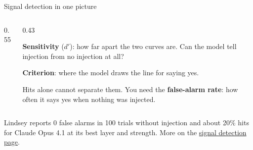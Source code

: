 \documentclass[aspectratio=169,11pt]{beamer}
\begin{document}
\begin{frame}[label=sdt]{Signal detection in one picture}
\begin{columns}[T]
\begin{column}{0.55\textwidth}
\end{column}
\begin{column}{0.43\textwidth}
{\small
\textbf{\textcolor{report}{Sensitivity}} ($d'$): how far apart the two curves are. Can the model tell injection from no injection at all?

\vspace{0.5em}
\textbf{\textcolor{bias}{Criterion}}: where the model draws the line for saying yes.

\vspace{0.5em}
Hits alone cannot separate them. You need the \textbf{false-alarm rate}: how often it says yes when nothing was injected.
}
\end{column}
\end{columns}

\vspace{0.4em}
{\footnotesize Lindsey reports 0 false alarms in 100 trials without injection and about 20\% hits for Claude Opus 4.1 at its best layer and strength. More on the \href{https://measuring-introspection.github.io/measuring-introspection/foundations/signal-detection/}{signal detection page}.}
\end{frame}
\end{document}
